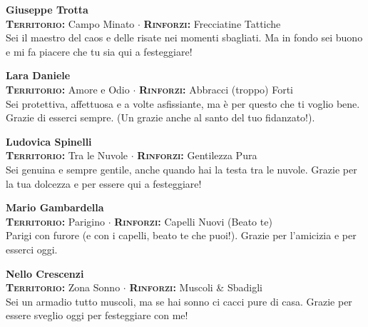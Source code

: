 \noindent\begin{minipage}{\linewidth}
\textbf{Giuseppe Trotta} \\
{\footnotesize \textbf{\textsc{Territorio:}} Campo Minato $\cdot$ \textbf{\textsc{Rinforzi:}} Frecciatine Tattiche} \\
Sei il maestro del caos e delle risate nei momenti sbagliati. Ma in fondo sei buono e mi fa piacere che tu sia qui a festeggiare!
\end{minipage}
\vspace{0.6cm}

\noindent\begin{minipage}{\linewidth}
\textbf{Lara Daniele} \\
{\footnotesize \textbf{\textsc{Territorio:}} Amore e Odio $\cdot$ \textbf{\textsc{Rinforzi:}} Abbracci (troppo) Forti} \\
Sei protettiva, affettuosa e a volte asfissiante, ma è per questo che ti voglio bene. Grazie di esserci sempre. (Un grazie anche al santo del tuo fidanzato!).
\end{minipage}
\vspace{0.6cm}

\noindent\begin{minipage}{\linewidth}
\textbf{Ludovica Spinelli} \\
{\footnotesize \textbf{\textsc{Territorio:}} Tra le Nuvole $\cdot$ \textbf{\textsc{Rinforzi:}} Gentilezza Pura} \\
Sei genuina e sempre gentile, anche quando hai la testa tra le nuvole. Grazie per la tua dolcezza e per essere qui a festeggiare!
\end{minipage}
\vspace{0.6cm}

\noindent\begin{minipage}{\linewidth}
\textbf{Mario Gambardella} \\
{\footnotesize \textbf{\textsc{Territorio:}} Parigino $\cdot$ \textbf{\textsc{Rinforzi:}} Capelli Nuovi (Beato te)} \\
Parigi con furore (e con i capelli, beato te che puoi!). Grazie per l'amicizia e per esserci oggi.
\end{minipage}
\vspace{0.6cm}

\noindent\begin{minipage}{\linewidth}
\textbf{Nello Crescenzi} \\
{\footnotesize \textbf{\textsc{Territorio:}} Zona Sonno $\cdot$ \textbf{\textsc{Rinforzi:}} Muscoli \& Sbadigli} \\
Sei un armadio tutto muscoli, ma se hai sonno ci cacci pure di casa. Grazie per essere sveglio oggi per festeggiare con me!
\end{minipage}
\vspace{0.6cm}

